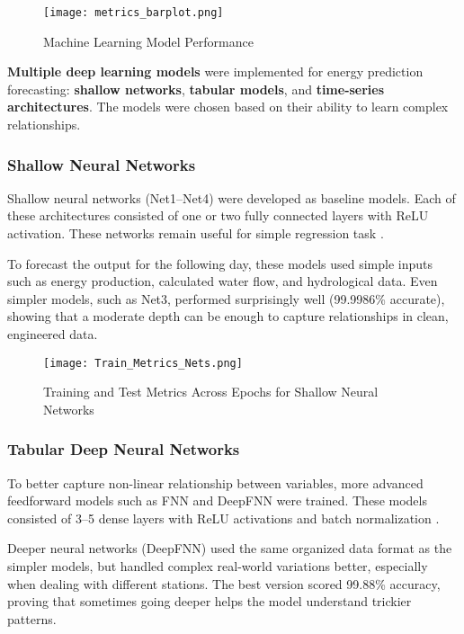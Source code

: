\documentclass[12pt]{article}
\begin{document}
\begin{figure}[H]
    \centering
    \texttt{[image: metrics\_barplot.png]}
    \caption{Machine Learning Model Performance}
    \label{fig:ml_metrics}
\end{figure}

\textbf{Multiple deep learning models} were implemented for energy prediction forecasting: \textbf{shallow networks}, \textbf{tabular models}, and \textbf{time-series architectures}. The models were chosen based on their ability to learn complex relationships.


\subsubsection{Shallow Neural Networks}
\label{sec:shallow}
Shallow neural networks (Net1--Net4) were developed as baseline models. Each of these architectures consisted of one or two fully connected layers with ReLU activation. These networks remain useful for simple regression task \cite{lecun2015deep}.

To forecast the output for the following day, these models used simple inputs such as energy production, calculated water flow, and hydrological data. Even simpler models, such as Net3, performed surprisingly well (99.9986\% accurate), showing that a moderate depth can be enough to capture relationships in clean, engineered data.

\begin{figure}[H]
    \centering
    \texttt{[image: Train\_Metrics\_Nets.png]}
    \caption{Training and Test Metrics Across Epochs for Shallow Neural Networks}
    \label{fig:net_metrics}
\end{figure}

\subsubsection{Tabular Deep Neural Networks}
\label{sec:tab}

To better capture non-linear relationship between variables, more advanced feedforward models such as FNN and DeepFNN were trained. These models consisted of 3--5 dense layers with ReLU activations and batch normalization \cite{sazli2006, borisov2021}. 

Deeper neural networks (DeepFNN) used the same organized data format as the simpler models, but handled complex real-world variations better, especially when dealing with different stations. The best version scored 99.88\% accuracy, proving that sometimes going deeper helps the model understand trickier patterns.
\end{document}
